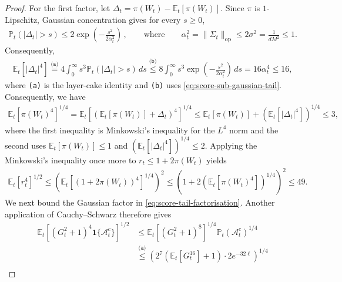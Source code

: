 \documentclass[11pt]{article}
\newcommand{\reason}[1]{\texttt{(#1)}}
\newcommand{\explan}[2]{\stackrel{\reason{#2}}{#1}}
\newcommand{\E}{\mathbb E}
\newcommand{\Pp}{\mathbb P}
\newcommand{\op}{\mathrm{op}}
\newcommand{\1}{\mathbf 1}
\begin{document}
\begin{proof}
    For the first factor, let $\Delta_t=\pi(W_t)-\E_t[\pi(W_t)]$.
    Since $\pi$ is $1$-Lipschitz, Gaussian concentration gives for every $s\geq0$,
    \begin{align}
        \Pp_t(|\Delta_t|>s)
        \leq
        2\exp\left(-\frac{s^2}{2\alpha_t^2}\right)\,,
        \qquad
        \text{where}
        \qquad
        \alpha_t^2
        =
        \|\Sigma_t\|_{\op}
        \leq
        2\sigma^2
        =
        \frac1{dM^2}
        \leq1.
        \label{eq:score-sub-gaussian-tail}
    \end{align}
    Consequently,
    \begin{align}
        \E_t[|\Delta_t|^4]
        \explan{=}{a}
        4\int_0^\infty
        s^3\Pp_t(|\Delta_t|>s)\,ds
        \explan{\leq}{b}
        8\int_0^\infty
        s^3\exp\left(-\frac{s^2}{2\alpha_t^2}\right)\,ds
        =
        16\alpha_t^4
        \leq
        16,
    \end{align}
    where \reason{a} is the layer-cake identity and \reason{b} uses
    \eqref{eq:score-sub-gaussian-tail}.
    Consequently, we have
    \begin{align}
        \E_t[\pi(W_t)^4]^{1/4}
        =
        \E_t[\left(\E_t[\pi(W_t)] + \Delta_t\right)^4]^{1/4}
        \leq
        \E_t[\pi(W_t)]
        +\left(\E_t[|\Delta_t|^4]\right)^{1/4}
        \leq
        3,
    \end{align}
    where the first inequality is Minkowski's inequality for the $L^4$ norm
    and the second uses $\E_t[\pi(W_t)]\leq1$ and $\left(\E_t[|\Delta_t|^4]\right)^{1/4}\leq2$.
    Applying the Minkowski's inequality once more to
    $r_t\leq1+2\pi(W_t)$ yields
    \begin{align}
        \E_t[r_t^4]^{1/2}
        \leq
        \left(\E_t[(1+2\pi(W_t))^4]^{1/4}\right)^2
        \leq
        \left(
        1+2\left(\E_t[\pi(W_t)^4]\right)^{1/4}
        \right)^2
        \leq
        49.
        \label{eq:score-r-fourth-moment}
    \end{align}
    We next bound the Gaussian factor in
    \eqref{eq:score-tail-factorisation}.
    Another application of Cauchy--Schwarz therefore gives
    \begin{align}
        \E_t\left[
            (G_t^2+1)^4\1\{\mathcal A_t^c\}
            \right]^{1/2}
         & \leq
        \E_t[(G_t^2+1)^8]^{1/4}
        \Pp_t(\mathcal A_t^c)^{1/4} \\
         & \explan{\leq}{a}
        \left(
        2^7\left(\E_t[G_t^{16}]+1\right)
        \cdot
        2e^{-32\ell}
        \right)^{1/4}               \\

\end{align}
\end{proof}
\end{document}
